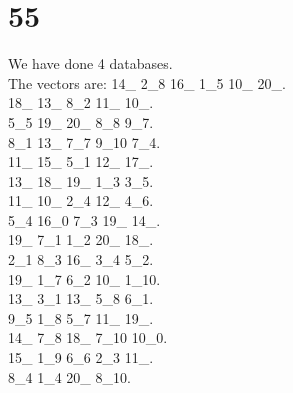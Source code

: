\chapter{55}
\indent We have done 4 databases.\\
The vectors are:
14\_ 2\_8 16\_ 1\_5 10\_ 20\_.\\18\_ 13\_ 8\_2 11\_ 10\_.\\5\_5 19\_ 20\_ 8\_8 9\_7.\\8\_1 13\_ 7\_7 9\_10 7\_4.\\11\_ 15\_ 5\_1 12\_ 17\_.\\13\_ 18\_ 19\_ 1\_3 3\_5.\\11\_ 10\_ 2\_4 12\_ 4\_6.\\5\_4 16\_0 7\_3 19\_ 14\_.\\19\_ 7\_1 1\_2 20\_ 18\_.\\2\_1 8\_3 16\_ 3\_4 5\_2.\\19\_ 1\_7 6\_2 10\_ 1\_10.\\13\_ 3\_1 13\_ 5\_8 6\_1.\\9\_5 1\_8 5\_7 11\_ 19\_.\\14\_ 7\_8 18\_ 7\_10 10\_0.\\15\_ 1\_9 6\_6 2\_3 11\_.\\8\_4 1\_4 20\_ 8\_10.\\